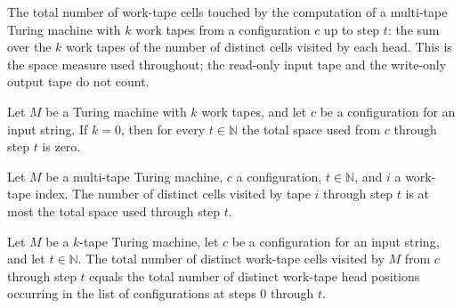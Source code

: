 \begin{definition}
\label{Turing.MultiTapeTM.spaceUsed}
\leanok
{}
The total number of work-tape cells touched by the computation of a
multi-tape Turing machine with $k$ work tapes from a configuration $c$ up to
step $t$: the sum over the $k$ work tapes of the number of distinct cells
visited by each head.  This is the space measure used throughout; the
read-only input tape and the write-only output tape do not count.
\end{definition}

\begin{lemma}
\label{Turing.MultiTapeTM.spaceUsed_zero_tapes_eq_zero}
\leanok
{}
Let $M$ be a Turing machine with $k$ work tapes, and let $c$ be a configuration for an
input string. If $k=0$, then for every $t\in\mathbb{N}$ the total space used from $c$
through step $t$ is zero.
\end{lemma}

\begin{lemma}
\label{Turing.MultiTapeTM.spaceUsedByTape_le_spaceUsed}
\leanok
{}
Let $M$ be a multi-tape Turing machine, $c$ a configuration, $t\in\mathbb{N}$, and $i$ a
work-tape index. The number of distinct cells visited by tape $i$ through step $t$ is at
most the total space used through step $t$.
\end{lemma}

\begin{lemma}
\label{Turing.MultiTapeTM.spaceUsed_eq_spaceUsedOfCfgs}
\leanok
{}
Let $M$ be a $k$-tape Turing machine, let $c$ be a configuration for an input string,
and let $t\in\mathbb{N}$. The total number of distinct work-tape cells visited by $M$
from $c$ through step $t$ equals the total number of distinct work-tape head positions
occurring in the list of configurations at steps $0$ through $t$.
\end{lemma}

